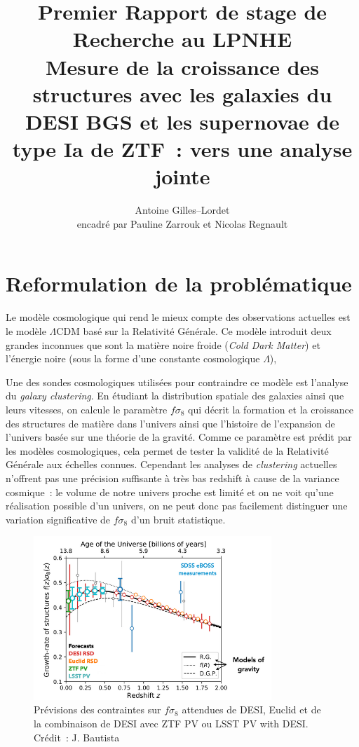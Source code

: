 \documentclass{article}
\title{Premier Rapport de stage de Recherche au LPNHE\\\vspace{.3em} \large Mesure de la croissance des structures avec les galaxies du DESI BGS et les supernovae de type Ia de ZTF~: vers une analyse jointe}
\author{Antoine Gilles--Lordet\\ \vspace{.1em} \small encadré par Pauline Zarrouk et Nicolas Regnault }
\date{}
\begin{document}
\maketitle

\section{Reformulation de la problématique}


Le modèle cosmologique qui rend le mieux compte des observations actuelles est le modèle $\Lambda$CDM basé sur la Relativité Générale. Ce modèle introduit deux grandes inconnues que sont la matière noire froide (\textit{Cold Dark Matter}) et l'énergie noire (sous la forme d'une constante cosmologique $\Lambda$), 

Une des sondes cosmologiques utilisées pour contraindre ce modèle est l'analyse du \textit{galaxy clustering}. En étudiant la distribution spatiale des galaxies ainsi que leurs vitesses, on calcule le paramètre $f\sigma_8$ qui décrit la formation et la croissance des structures de matière dans l'univers ainsi que l'histoire de l'expansion de l'univers basée sur une théorie de la gravité. Comme ce paramètre est prédit par les modèles cosmologiques, cela permet de tester la validité de la Relativité Générale aux échelles connues. Cependant les analyses de \textit{clustering} actuelles n'offrent pas une précision suffisante à très bas redshift à cause de la variance cosmique~: le volume de notre univers proche est limité et on ne voit qu'une réalisation possible d'un univers, on ne peut donc pas facilement distinguer une variation significative de $f\sigma_8$ d'un bruit statistique.

\begin{figure}
    \centering
    \includegraphics[width=0.8\textwidth]{figures/fs8.png}
    \caption{Prévisions des contraintes sur $f\sigma_8$ attendues de DESI, Euclid et de la combinaison de DESI avec ZTF PV ou LSST PV with DESI. Crédit~: J. Bautista}
    \label{fig:fs8}
\end{figure}
\end{document}
